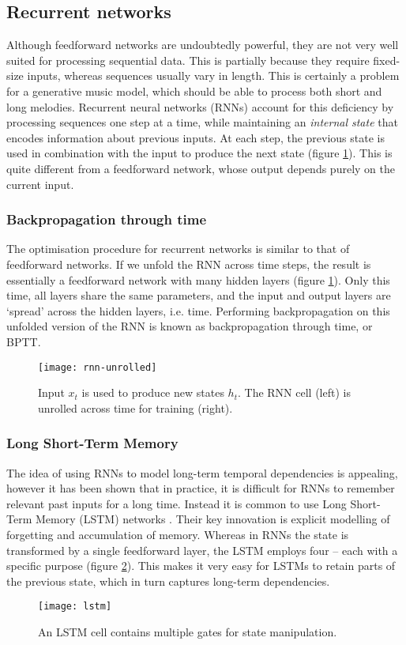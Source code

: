 \documentclass[../../report.tex]{subfiles}
\begin{document}
\subsection{Recurrent networks}

Although feedforward networks are undoubtedly powerful, they are not very well
suited for processing sequential data. This is partially because they require
fixed-size inputs, whereas sequences usually vary in length. This is certainly a
problem for a generative music model, which should be able to process both short
and long melodies. Recurrent neural networks (RNNs) account for this deficiency
by processing sequences one step at a time, while maintaining an \emph{internal
state} that encodes information about previous inputs. At each step, the
previous state is used in combination with the input to produce the next state
(figure \ref{fig:rnn-unrolled}). This is quite different from a feedforward
network, whose output depends purely on the current input.

\subsubsection{Backpropagation through time}
The optimisation procedure for recurrent networks is similar to that of
feedforward networks. If we unfold the RNN across time steps, the result is
essentially a feedforward network with many\footnotemark{} hidden layers (figure
\ref{fig:rnn-unrolled}). Only this time, all layers share the same parameters,
and the input and output layers are `spread' across the hidden layers, i.e.
time. Performing backpropagation on this unfolded version of the RNN is known as
backpropagation through time, or BPTT.


\begin{figure}
  \centering
  \texttt{[image: rnn-unrolled]}
  \caption{Input \(x_t\) is used to produce new states \(h_t\). The RNN cell
  (left) is unrolled across time for training (right). \cite{Olah2015LSTM}}
  \label{fig:rnn-unrolled}
\end{figure}

\subsubsection{Long Short-Term Memory}
The idea of using RNNs to model long-term temporal dependencies is appealing,
however it has been shown \cite{Bengio1994} that in practice, it is difficult
for RNNs to remember relevant past inputs for a long time. Instead it is common
to use Long Short-Term Memory (LSTM) networks \cite{Hochreiter1997}. Their key
innovation is explicit modelling of forgetting and accumulation of memory.
Whereas in RNNs the state is transformed by a single feedforward layer, the LSTM
employs four -- each with a specific purpose (figure \ref{fig:lstm}). This makes
it very easy for LSTMs to retain parts of the previous state, which in turn
captures long-term dependencies.

\begin{figure}
  \centering
  \texttt{[image: lstm]}
  \caption{An LSTM cell contains multiple gates for state manipulation. \cite{Olah2015LSTM}}
  \label{fig:lstm}
\end{figure}
\end{document}
